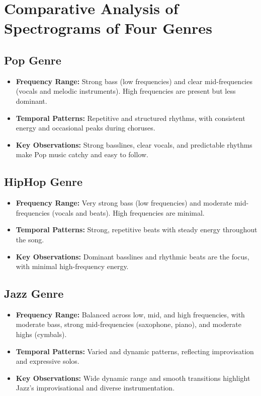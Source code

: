 \documentclass[a4paper,12pt]{article}
\begin{document}
\newpage
\section{Comparative Analysis of Spectrograms of Four Genres}
\subsection{Pop Genre}
\begin{itemize}
    \item \textbf{Frequency Range:} Strong bass (low frequencies) and clear mid-frequencies (vocals and melodic instruments). High frequencies are present but less dominant.
    \item \textbf{Temporal Patterns:} Repetitive and structured rhythms, with consistent energy and occasional peaks during choruses.
    \item \textbf{Key Observations:} Strong basslines, clear vocals, and predictable rhythms make Pop music catchy and easy to follow.
\end{itemize}

\subsection{HipHop Genre}
\begin{itemize}
    \item \textbf{Frequency Range:} Very strong bass (low frequencies) and moderate mid-frequencies (vocals and beats). High frequencies are minimal.
    \item \textbf{Temporal Patterns:} Strong, repetitive beats with steady energy throughout the song.
    \item \textbf{Key Observations:} Dominant basslines and rhythmic beats are the focus, with minimal high-frequency energy.
\end{itemize}


\subsection{Jazz Genre}
\begin{itemize}
    \item \textbf{Frequency Range:} Balanced across low, mid, and high frequencies, with moderate bass, strong mid-frequencies (saxophone, piano), and moderate highs (cymbals).
    \item \textbf{Temporal Patterns:} Varied and dynamic patterns, reflecting improvisation and expressive solos.
    \item \textbf{Key Observations:} Wide dynamic range and smooth transitions highlight Jazz’s improvisational and diverse instrumentation.
\end{itemize}
\end{document}
